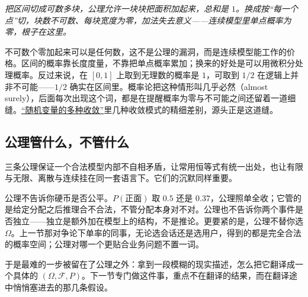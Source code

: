 \begin{center}

\emph{把区间切成可数多块，公理允许一块块把面积加起来，总和是 \(1\)。换成按``每一个点''切，块数不可数、每块宽度为零，加法失去意义——连续模型里单点概率为零，根子在这里。}
\end{center}

不可数个零加起来可以是任何数，这不是公理的漏洞，而是连续模型能工作的价格。区间的概率靠长度度量，不靠把单点概率累加；换来的好处是可以用微积分处理概率。反过来说，在 \([0,1]\) 上取到无理数的概率是 \(1\)，可取到 \(1/2\) 在逻辑上并非不可能——\(1/2\) 确实在区间里。概率论把这种情形叫几乎必然（almost surely），后面每次出现这个词，都是在提醒概率为零与不可能之间还留着一道细缝。\hyperref[sec:05-Probability/08-Limit-Theorems/01]{``随机变量的多种收敛''}里几种收敛模式的精细差别，源头正是这道缝。

\subsection{公理管什么，不管什么}

三条公理保证一个合法模型内部不自相矛盾，让常用恒等式有统一出处，也让有限与无限、离散与连续挂在同一套语言下。它们的沉默同样重要。

公理不告诉你硬币是否公平。\(P(\text{正面})\) 取 \(0.5\) 还是 \(0.37\)，公理照单全收；它管的是给定分配之后推理合不合法，不管分配本身对不对。公理也不告诉你两个事件是否独立——独立是额外加在模型上的结构，不是推论。更要紧的是，公理不替你选 \(\Omega\)。上一节那对争论下单率的同事，无论选会话还是选用户，得到的都是完全合法的概率空间；公理对哪一个更贴合业务问题不置一词。

于是最难的一步被留在了公理之外：拿到一段模糊的现实描述，怎么把它翻译成一个具体的 \((\Omega,\mathcal F,P)\)。下一节专门做这件事，重点不在翻译的结果，而在翻译途中悄悄塞进去的那几条假设。
